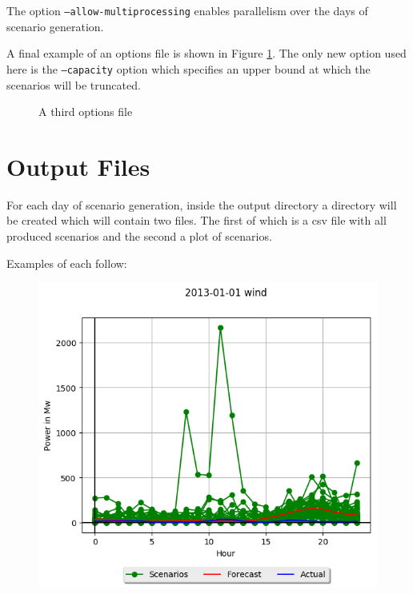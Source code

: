 \documentclass[11pt]{article}
\begin{document}
	The option \texttt{--allow-multiprocessing} enables parallelism over the
	days of scenario generation.
	
	A final example of an options file is shown in Figure \ref{example3}. The
	only new option used here is the \texttt{--capacity} option which specifies
	an upper bound at which the scenarios will be truncated.
	
	\begin{figure}[H]
	\begin{framed}
		
	\end{framed}
	\caption{A third options file}
	\label{example3}
	\end{figure}
	
	\section{Output Files}
	For each day of scenario generation, inside the output directory a 
	directory will be created which will
	contain two files. The first of which is a csv file with all produced
	scenarios and the second a plot of scenarios.
	
	Examples of each follow:
	
	\begin{figure}
		\begin{framed}
			
		\end{framed}
	\end{figure}		
	
	\begin{figure}
	\includegraphics{wind.png}
	\end{figure}	
	
\end{document}
